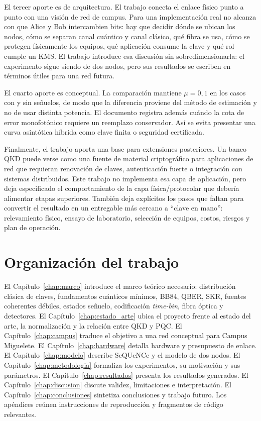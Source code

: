 El tercer aporte es de arquitectura. El trabajo conecta el enlace físico punto a punto con una visión de red de campus. Para una implementación real no alcanza con que Alice y Bob intercambien bits: hay que decidir dónde se ubican los nodos, cómo se separan canal cuántico y canal clásico, qué fibra se usa, cómo se protegen físicamente los equipos, qué aplicación consume la clave y qué rol cumple un KMS. El trabajo introduce esa discusión sin sobredimensionarla: el experimento sigue siendo de dos nodos, pero sus resultados se escriben en términos útiles para una red futura.

El cuarto aporte es conceptual. La comparación mantiene \(\mu=0{,}1\) en los casos con y sin señuelos, de modo que la diferencia proviene del método de estimación y no de usar distinta potencia. El documento registra además cuándo la cota de error monofotónico requiere un reemplazo conservador. Así se evita presentar una curva asintótica híbrida como clave finita o seguridad certificada.

Finalmente, el trabajo aporta una base para extensiones posteriores. Un banco QKD puede verse como una fuente de material criptográfico para aplicaciones de red que requieran renovación de claves, autenticación fuerte o integración con sistemas distribuidos. Este trabajo no implementa esa capa de aplicación, pero deja especificado el comportamiento de la capa física/protocolar que debería alimentar etapas superiores. También deja explícitos los pasos que faltan para convertir el resultado en un entregable más cercano a ``clave en mano'': relevamiento físico, ensayo de laboratorio, selección de equipos, costos, riesgos y plan de operación.

\section{Organización del trabajo}

El Capítulo~\ref{chap:marco} introduce el marco teórico necesario: distribución clásica de claves, fundamentos cuánticos mínimos, BB84, QBER, SKR, fuentes coherentes débiles, estados señuelo, codificación \textit{time-bin}, fibra óptica y detectores. El Capítulo~\ref{chap:estado_arte} ubica el proyecto frente al estado del arte, la normalización y la relación entre QKD y PQC. El Capítulo~\ref{chap:campus} traduce el objetivo a una red conceptual para Campus Miguelete. El Capítulo~\ref{chap:hardware} detalla hardware y presupuesto de enlace. El Capítulo~\ref{chap:modelo} describe SeQUeNCe y el modelo de dos nodos. El Capítulo~\ref{chap:metodologia} formaliza los experimentos, su motivación y sus parámetros. El Capítulo~\ref{chap:resultados} presenta los resultados generados. El Capítulo~\ref{chap:discusion} discute validez, limitaciones e interpretación. El Capítulo~\ref{chap:conclusiones} sintetiza conclusiones y trabajo futuro. Los apéndices reúnen instrucciones de reproducción y fragmentos de código relevantes.
